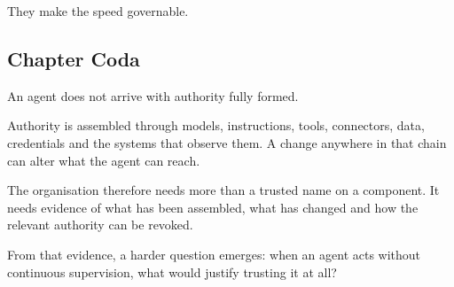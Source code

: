 They make the speed governable.

\subsection{Chapter Coda}\label{chapter-coda}

An agent does not arrive with authority fully formed.

Authority is assembled through models, instructions, tools, connectors,
data, credentials and the systems that observe them. A change anywhere
in that chain can alter what the agent can reach.

The organisation therefore needs more than a trusted name on a
component. It needs evidence of what has been assembled, what has
changed and how the relevant authority can be revoked.

From that evidence, a harder question emerges: when an agent acts
without continuous supervision, what would justify trusting it at all?
